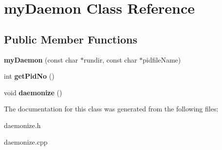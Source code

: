 \hypertarget{classmyDaemon}{\section{my\-Daemon Class Reference}
\label{classmyDaemon}
}
\subsection*{Public Member Functions}
\begin{DoxyCompactItemize}
\item 
\hypertarget{classmyDaemon_a0e7924e217104938e0b4dd9e089a0c7d}{{\bfseries my\-Daemon} (const char $\ast$rundir, const char $\ast$pidfile\-Name)}\label{classmyDaemon_a0e7924e217104938e0b4dd9e089a0c7d}

\item 
\hypertarget{classmyDaemon_ad684d593d9d7ffcb7581faa965aa38f1}{int {\bfseries get\-Pid\-No} ()}\label{classmyDaemon_ad684d593d9d7ffcb7581faa965aa38f1}

\item 
\hypertarget{classmyDaemon_a0f1d30f6ada5fa68611ec491071c31dd}{void {\bfseries daemonize} ()}\label{classmyDaemon_a0f1d30f6ada5fa68611ec491071c31dd}

\end{DoxyCompactItemize}


The documentation for this class was generated from the following files\-:\begin{DoxyCompactItemize}
\item 
daemonize.\-h\item 
daemonize.\-cpp\end{DoxyCompactItemize}
